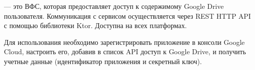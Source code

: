   \subsubsection{}\label{solution-google-drive-fs}
     --- это ВФС, которая предоставляет доступ к содержимому Google Drive пользователя. Коммуникация с сервисом осуществляется через REST HTTP API с помощью библиотеки Ktor. Доступна на всех платформах.

    Для использования необходимо зарегистрировать приложение в консоли Google Cloud\cite{google-cloud}, настроить его, добавив в список API доступ к Google Drive, и получить учетные данные (идентификатор приложения и секретный ключ).


